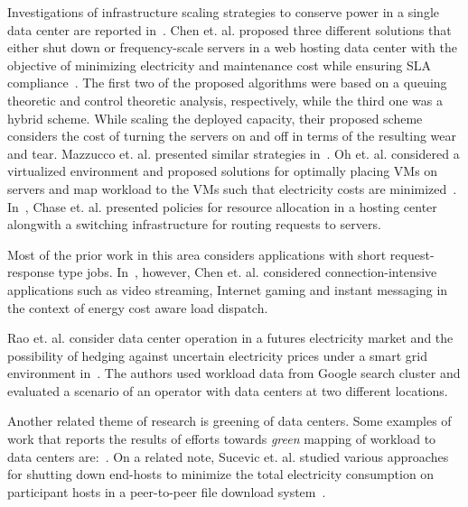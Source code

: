 Investigations of infrastructure scaling strategies to conserve power in a single data center are reported in~\cite{serverEnergy,Mazzucco:Maximizing:2011:CoRR,Oh:2011:ECS:2170444.2170458,Chase:2001:MES:502059.502045}. Chen et. al. proposed three different solutions that either shut down or frequency-scale servers in a web hosting data center with the objective of minimizing electricity and maintenance cost while ensuring SLA compliance~\cite{serverEnergy}. The first two of the proposed algorithms were based on a queuing theoretic and control theoretic analysis, respectively, while the third one was a hybrid scheme. While scaling the deployed capacity, their proposed scheme considers the cost of turning the servers on and off in terms of the resulting wear and tear. Mazzucco et. al. presented similar strategies in~\cite{Mazzucco:Maximizing:2011:CoRR}. Oh et. al. considered a virtualized environment and proposed solutions for optimally placing VMs on servers and map workload to the VMs such that electricity costs are minimized~\cite{Oh:2011:ECS:2170444.2170458}. In~\cite{Chase:2001:MES:502059.502045}, Chase et. al. presented policies for resource allocation in a hosting center alongwith a switching infrastructure for routing requests to servers.

Most of the prior work in this area considers applications with short request-response type jobs. In~\cite{Chen:2008:ESP:1387589.1387613}, however, Chen et. al. considered connection-intensive applications such as video streaming, Internet gaming and instant messaging in the context of energy cost aware load dispatch. 

Rao et. al. consider data center operation in a futures electricity market and the possibility of hedging against uncertain electricity prices under a smart grid environment in~\cite{Rao:2011:TSG}. The authors used workload data from Google search cluster and evaluated a scenario of an operator with data centers at two different locations.

Another related theme of research is greening of data centers. Some examples of work that reports the results of efforts towards \textit{green} mapping of workload to data centers are:~\cite{Le:HotPower:2009,Zheng2011275,Koutitas:2010:JGE,abbasi2011dahm,chiaraviglio2010greencoop,Phan:2012:GECCO,Liu:2011:SIGMETRICS,Liu:2011:GREENMETRICS}. On a related note, Sucevic et. al. studied various approaches for shutting down end-hosts to minimize the total electricity consumption on participant hosts in a peer-to-peer file download system~\cite{Sucevic:2011:PDE:2160803.2160864}.

